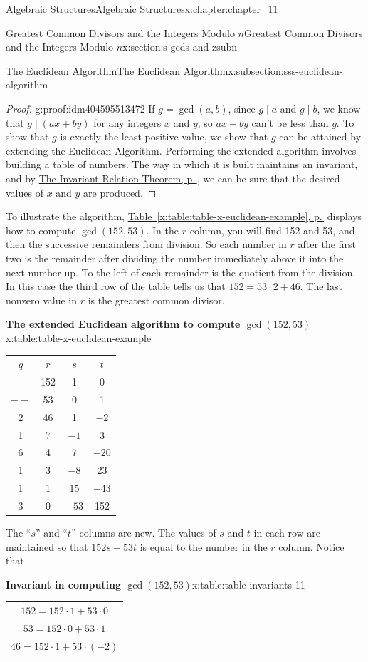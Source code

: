 \documentclass[twoside,10pt,]{book}
\newcommand{\tabularfont}{\relax}
\newcommand{\xreffont}{\relax}
\numberwithin{equation}{section}
\newcommand{\hrulethick} {\noalign{\hrule height 0.11em}}
\begin{document}
\begin{chapterptx}{Algebraic Structures}{}{Algebraic Structures}{}{}{x:chapter:chapter_11}
\begin{sectionptx}{Greatest Common Divisors  and the Integers Modulo \(n\)}{}{Greatest Common Divisors  and the Integers Modulo \(n\)}{}{}{x:section:s-gcds-and-zsubn}
\begin{subsectionptx}{The Euclidean Algorithm}{}{The Euclidean Algorithm}{}{}{x:subsection:sss-euclidean-algorithm}
\begin{proof}{}{g:proof:idm404595513472}
If  \(g = \gcd(a, b)\), since \(g \mid a\) and  \(g \mid b\), we know that  \(g \mid (a x + b y)\) for any integers \(x\) and \(y\), so \(a x + b y\) can't be less than \(g\).  To show that \(g\) is exactly the least positive value, we show that \(g\) can be attained by extending the Euclidean Algorithm.  Performing the extended algorithm involves building a table of numbers.  The way in which it is built  maintains an invariant, and by \hyperref[x:theorem:th-invariant-relation-theorem]{The Invariant Relation Theorem, p.\,\pageref{x:theorem:th-invariant-relation-theorem}}, we can be sure that the desired values of \(x\) and \(y\) are produced.%
\end{proof}
To illustrate the algorithm, \hyperref[x:table:table-x-euclidean-example]{Table~{\xreffont\ref{x:table:table-x-euclidean-example}}, p.\,\pageref{x:table:table-x-euclidean-example}} displays how to compute \(\gcd(152,53)\).   In the \(r\) column, you will find 152 and 53, and then the successive remainders from division.  So each number in \(r\) after the first two is the remainder after dividing the number immediately above it into the next number up.  To the left of each remainder is the quotient from the division.  In this case the third row of the table tells us that \(152 = 53\cdot 2 + 46\). The last nonzero value in \(r\) is the greatest common divisor.%
\begin{tableptx}{\textbf{The extended Euclidean algorithm to compute \(\gcd(152,53)\)}}{x:table:table-x-euclidean-example}{}%
\centering
{\tabularfont%
\begin{tabular}{cccc}\hrulethick
\(q\)&\(r\)&\(s\)&\(t\)\tabularnewline[0pt]
\(--\)&152&1&0\tabularnewline[0pt]
\(--\)&53&0&1\tabularnewline[0pt]
2&46&1&\(-2\)\tabularnewline[0pt]
1&7&\(-1\)&3\tabularnewline[0pt]
6&4&7&\(-20\)\tabularnewline[0pt]
1&3&\(-8\)&23\tabularnewline[0pt]
1&1&15&\(-43\)\tabularnewline[0pt]
3&0&\(-53\)&152
\end{tabular}
}%
\end{tableptx}%
The ``\(s\)'' and ``\(t\)'' columns are new.  The values of \(s\) and \(t\) in each row are maintained so that \(152s + 53t\) is equal to the number in the \(r\) column.   Notice that%
\begin{tableptx}{\textbf{Invariant in computing \(\gcd(152,53)\)}}{x:table:table-invariants-11}{}%
\centering
{\tabularfont%
\begin{tabular}{c}
\(152 = 152\cdot 1+ 53\cdot 0\)\tabularnewline[0pt]
\(53 =152\cdot 0 + 53\cdot 1\)\tabularnewline[0pt]
\(46 = 152\cdot 1 + 53\cdot (-2)\)\tabularnewline[0pt]

\end{tabular}}
\end{tableptx}
\end{subsectionptx}
\end{sectionptx}
\end{chapterptx}
\end{document}
